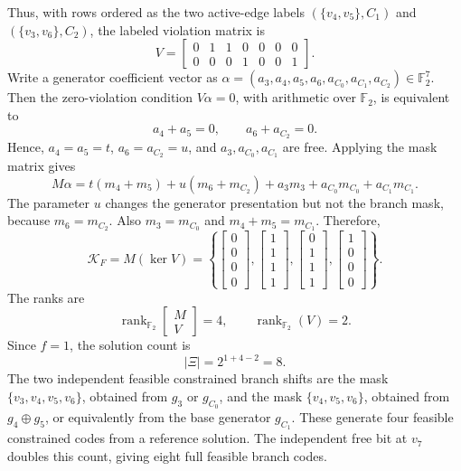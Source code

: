 \documentclass[11pt]{article}
\theoremstyle{plain}
\theoremstyle{definition}
\begin{document}
Thus, with rows ordered as the two active-edge labels $(\{v_4, v_5\},C_1)$ and $(\{v_3, v_6\},C_2)$, the labeled violation matrix is
\[
V=
\begin{bmatrix}
0&1&1&0&0&0&0\\
0&0&0&1&0&0&1
\end{bmatrix}.
\]
Write a generator coefficient vector as $\alpha = (a_3,a_4,a_5,a_6,a_{C_0},a_{C_1},a_{C_2}) \in \mathbb{F}_2^7$. Then the zero-violation condition $V\alpha = 0$, with arithmetic over $\mathbb{F}_2$, is equivalent to
\[
a_4+a_5=0,
\qquad
a_6+a_{C_2}=0.
\]
Hence, $a_4=a_5=t$, $a_6=a_{C_2}=u$, and $a_3,a_{C_0},a_{C_1}$ are free. Applying the mask matrix gives
\[
M\alpha
=
t(m_4+m_5)+u(m_6+m_{C_2})+a_3m_3+a_{C_0}m_{C_0}+a_{C_1}m_{C_1}.
\]
The parameter $u$ changes the generator presentation but not the branch mask, because $m_6=m_{C_2}$. Also $m_3=m_{C_0}$ and $m_4+m_5=m_{C_1}$. Therefore,
\[
\mathcal{K}_F
=
M(\ker V)
=
\left\{
\begin{bmatrix}0\\0\\0\\0\end{bmatrix},
\begin{bmatrix}1\\1\\1\\1\end{bmatrix},
\begin{bmatrix}0\\1\\1\\1\end{bmatrix},
\begin{bmatrix}1\\0\\0\\0\end{bmatrix}
\right\}.
\]
The ranks are
\[
\operatorname{rank}_{\mathbb{F}_2}\begin{bmatrix} M \\ V \end{bmatrix}=4,
\qquad
\operatorname{rank}_{\mathbb{F}_2}(V)=2.
\]
Since $f=1$, the solution count is
\[
\lvert \Xi \rvert = 2^{1+4-2} = 8.
\]
The two independent feasible constrained branch shifts are the mask $\{v_3,v_4,v_5,v_6\}$, obtained from $g_3$ or $g_{C_0}$, and the mask $\{v_4, v_5, v_6\}$, obtained from $g_4\oplus g_5$, or equivalently from the base generator $g_{C_1}$. These generate four feasible constrained codes from a reference solution. The independent free bit at $v_7$ doubles this count, giving eight full feasible branch codes.
\end{document}

